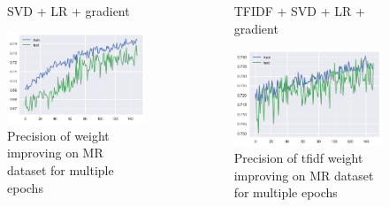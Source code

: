 \documentclass[xcolor={table}]{beamer}
\begin{document}
\begin{frame}{}
    \begin{columns}
                   \begin{figure}[H]
                    \centering
                    \caption*{SVD + LR + gradient}
                    \includegraphics[height=0.4\textheight]{images/MRDataset_grad.png}
                    \caption{Precision of weight improving on MR dataset for multiple epochs}
                \end{figure}

                \begin{figure}[H]
                    \centering
                    \caption*{TFIDF + SVD + LR + gradient}
                    \includegraphics[height=0.4\textheight]{images/MRDataset_tfidf_grad.png}
                    \caption{Precision of tfidf weight improving on MR dataset for multiple epochs}
                \end{figure}
    \end{columns}                
\end{frame} 
\end{document}
